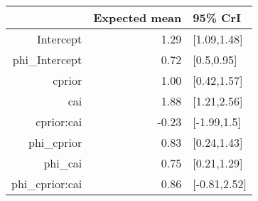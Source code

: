 \begin{tabular}{rrl}
  \hline
 & Expected mean & 95\% CrI \\ 
  \hline
Intercept & 1.29 & [1.09,1.48] \\ 
  phi\_Intercept & 0.72 & [0.5,0.95] \\ 
  cprior & 1.00 & [0.42,1.57] \\ 
  cai & 1.88 & [1.21,2.56] \\ 
  cprior:cai & -0.23 & [-1.99,1.5] \\ 
  phi\_cprior & 0.83 & [0.24,1.43] \\ 
  phi\_cai & 0.75 & [0.21,1.29] \\ 
  phi\_cprior:cai & 0.86 & [-0.81,2.52] \\ 
   \hline
\end{tabular}

